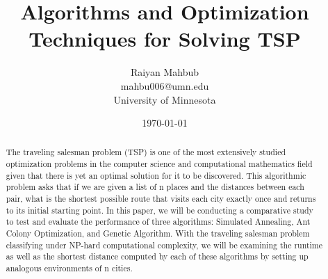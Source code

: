 \documentclass{article}
\title{Algorithms and Optimization Techniques for Solving TSP}
\author{Raiyan Mahbub \\ mahbu006@umn.edu \\ University of Minnesota}
\date{\today}
\begin{document}
\maketitle

\begin{abstract}
    
The traveling salesman problem (TSP) is one of the most extensively studied optimization problems in the computer science and computational mathematics field given that there is yet an optimal solution for it to be discovered. This algorithmic problem asks that if we are given a list of n places and the distances between each pair, what is the shortest possible route that visits each city exactly once and returns to its initial starting point. In this paper, we will be conducting a comparative study to test and evaluate the performance of three algorithms: Simulated Annealing, Ant Colony Optimization, and Genetic Algorithm. With the traveling salesman problem classifying under NP-hard computational complexity, we will be examining the runtime as well as the shortest distance computed by each of these algorithms by setting up analogous environments of n cities. \\
\end{abstract}
\end{document}

